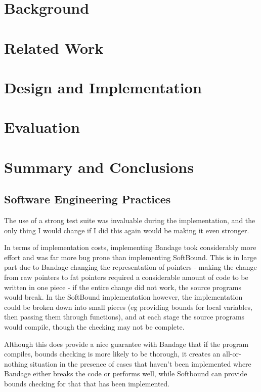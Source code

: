 \documentclass[a4paper,12pt,twoside,openright]{report}
\begin{document}
\chapter{Background} 


\chapter{Related Work} 


\chapter{Design and Implementation} 


\chapter{Evaluation} 


\chapter{Summary and Conclusions} 

\section{Software Engineering Practices}

The use of a strong test suite was invaluable during the implementation, and the only thing I would change if I did this again would be making it even stronger.

In terms of implementation costs, implementing Bandage took considerably more effort and was far more bug prone than implementing SoftBound.
This is in large part due to Bandage changing the representation of pointers - making the change from raw pointers to fat pointers required a considerable amount of code to be written in one piece - if the entire change did not work, the source programs would break.
In the SoftBound implementation however, the implementation could be broken down into small pieces (eg providing bounds for local variables, then passing them through functions), and at each stage the source programs would compile, though the checking may not be complete.

Although this does provide a nice guarantee with Bandage that if the program compiles, bounds checking is more likely to be thorough, it creates an all-or-nothing situation in the presence of cases that haven't been implemented where Bandage either breaks the code or performs well, while Softbound can provide bounds checking for that that has been implemented.
\end{document}
